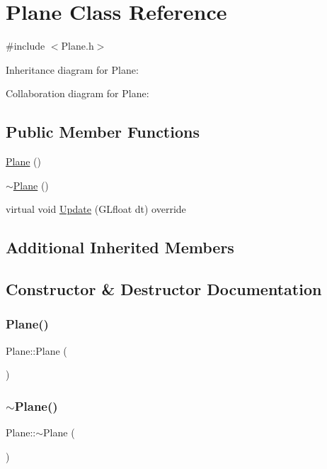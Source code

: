 \hypertarget{class_plane}{}\section{Plane Class Reference}
\label{class_plane}


{\ttfamily \#include $<$Plane.\+h$>$}



Inheritance diagram for Plane\+:


Collaboration diagram for Plane\+:
\subsection*{Public Member Functions}
\begin{DoxyCompactItemize}
\item 
\mbox{\hyperlink{class_plane_acac0d9c003e0ab10d07b146c3566a0c7}{Plane}} ()
\item 
\mbox{\hyperlink{class_plane_a69abd86051c880dcb44b249ad10c4436}{$\sim$\+Plane}} ()
\item 
virtual void \mbox{\hyperlink{class_plane_af1ed004221fa7b42136789cb2c48b124}{Update}} (G\+Lfloat dt) override
\end{DoxyCompactItemize}
\subsection*{Additional Inherited Members}


\subsection{Constructor \& Destructor Documentation}
\mbox{\label{class_plane_acac0d9c003e0ab10d07b146c3566a0c7}} 
\subsubsection{\texorpdfstring{Plane()}{Plane()}}
{\footnotesize\ttfamily Plane\+::\+Plane (\begin{DoxyParamCaption}{ }\end{DoxyParamCaption})}

\mbox{\label{class_plane_a69abd86051c880dcb44b249ad10c4436}} 
\subsubsection{\texorpdfstring{$\sim$Plane()}{~Plane()}}
{\footnotesize\ttfamily Plane\+::$\sim$\+Plane (\begin{DoxyParamCaption}{ }\end{DoxyParamCaption})}



